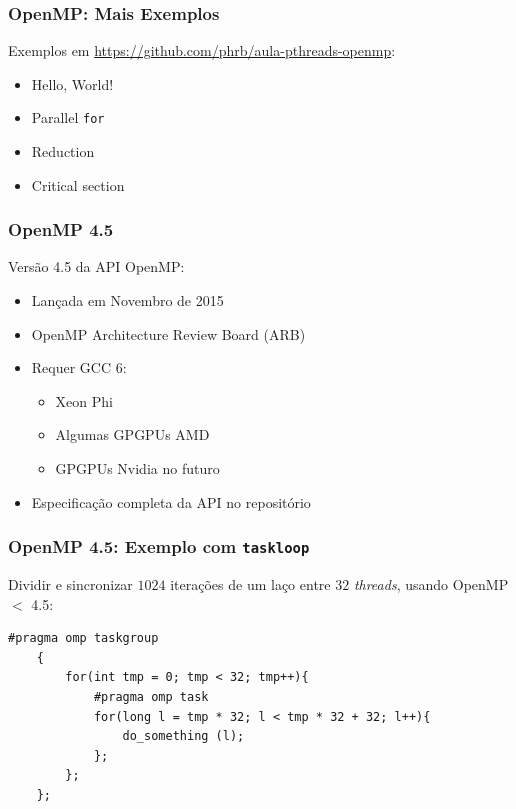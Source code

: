 \documentclass[10pt, compress]{beamer}
\begin{document}
\begin{frame}
    \frametitle{OpenMP: Mais Exemplos}
    Exemplos em \url{https://github.com/phrb/aula-pthreads-openmp}:
    \begin{itemize}
        \item Hello, World!
        \item Parallel \texttt{for}
        \item Reduction
        \item Critical section
    \end{itemize}
\end{frame}

\begin{frame}
    \frametitle{OpenMP 4.5}
    Versão \alert{4.5} da \alert{API OpenMP}:
    \begin{itemize}
        \item Lançada em \alert{Novembro de 2015}
        \item OpenMP \alert{Architecture Review Board} (ARB)
        \item Requer \alert{GCC 6}:
            \begin{itemize}
                \item Xeon Phi
                \item Algumas GPGPUs AMD
                \item GPGPUs Nvidia no futuro
            \end{itemize}
        \item \alert{Especificação completa} da API no repositório
    \end{itemize}
\end{frame}

\begin{frame}[fragile]
    \frametitle{OpenMP 4.5: Exemplo com \texttt{taskloop}}
    \alert{Dividir e sincronizar} $1024$ iterações de um laço entre $32$
    \textit{threads}, usando \alert{OpenMP $<$ 4.5}:

    \begin{lstlisting}[basicstyle=\ttfamily\scriptsize]
    #pragma omp taskgroup
    {
        for(int tmp = 0; tmp < 32; tmp++){
            #pragma omp task
            for(long l = tmp * 32; l < tmp * 32 + 32; l++){
                do_something (l);
            };
        };
    };
    \end{lstlisting}
\end{frame}
\end{document}
